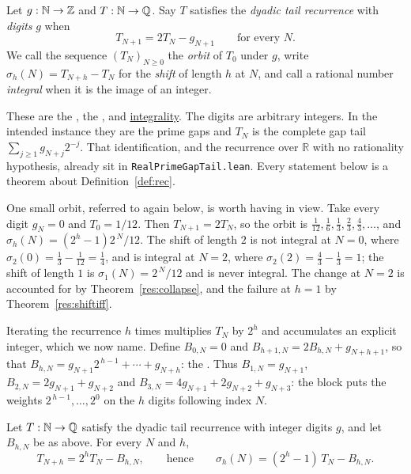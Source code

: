 \documentclass[11pt]{article}
\begin{document}
\begin{definition}\label{def:rec}
Let $g:\mathbb{N}\to\mathbb{Z}$ and $T:\mathbb{N}\to\mathbb{Q}$.  Say $T$ satisfies the \emph{dyadic tail
recurrence} with \emph{digits} $g$ when
\[
 T_{N+1}=2T_N-g_{N+1}\qquad\text{for every }N .
\]
We call the sequence $(T_N)_{N\ge0}$ the \emph{orbit} of $T_0$ under $g$,
write $\sigma_h(N)=T_{N+h}-T_N$ for the \emph{shift} of length $h$ at $N$, and
call a rational number \emph{integral} when it is the image of an integer.
\end{definition}

\noindent These are the
, the
, and
\href{https://github.com/wcook04/plectis-erdos/blob/99f4bf47422abbd8757cbb22b50ba079d764d3a7/ErdosProblems/Erdos251/PrimeGapDyadicTail.lean#L575}{integrality}.
The digits are arbitrary integers.  In the intended instance they are the prime
gaps and $T_N$ is the complete gap tail $\sum_{j\ge1}g_{N+j}2^{-j}$.  That
identification, and the recurrence over $\mathbb R$ with no rationality
hypothesis, already sit in \texttt{RealPrimeGapTail.lean}.  Every statement
below is a theorem about Definition~\ref{def:rec}.

One small orbit, referred to again below, is worth having in view.  Take every
digit $g_N=0$ and $T_0=1/12$.  Then $T_{N+1}=2T_N$, so the orbit is
$\tfrac1{12},\tfrac16,\tfrac13,\tfrac23,\tfrac43,\ldots$, and
$\sigma_h(N)=(2^{h}-1)2^{\,N}/12$.  The shift of length $2$ is not integral at
$N=0$, where $\sigma_2(0)=\tfrac13-\tfrac1{12}=\tfrac14$, and is integral at
$N=2$, where $\sigma_2(2)=\tfrac43-\tfrac13=1$; the shift of length $1$ is
$\sigma_1(N)=2^{\,N}/12$ and is never integral.  The change at $N=2$ is
accounted for by Theorem~\ref{res:collapse}, and the failure at $h=1$ by
Theorem~\ref{res:shiftiff}.

Iterating the recurrence $h$ times multiplies $T_N$ by $2^{h}$ and accumulates
an explicit integer, which we now name.  Define
$B_{0,N}=0$ and $B_{h+1,N}=2B_{h,N}+g_{N+h+1}$, so that
$B_{h,N}=g_{N+1}2^{\,h-1}+\cdots+g_{N+h}$: the
.
Thus $B_{1,N}=g_{N+1}$, $B_{2,N}=2g_{N+1}+g_{N+2}$ and
$B_{3,N}=4g_{N+1}+2g_{N+2}+g_{N+3}$: the block puts the weights
$2^{\,h-1},\ldots,2^{0}$ on the $h$ digits following index $N$.

\begin{theorem}\label{res:block}
Let $T:\mathbb{N}\to\mathbb{Q}$ satisfy the dyadic tail recurrence with integer digits $g$, and
let $B_{h,N}$ be as above.  For every $N$ and $h$,
\[
 T_{N+h}=2^{h}T_N-B_{h,N},
 \qquad\text{hence}\qquad
 \sigma_h(N)=(2^{h}-1)\,T_N-B_{h,N} .
\]
\end{theorem}
\end{document}
